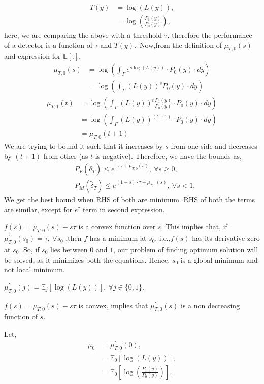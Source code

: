 \documentclass[a4paper,english,12pt]{article}
\begin{document}
\begin{align*}
T(y)&=\log(L(y)),\\
&=\log\left(\frac{P_1(y)}{P_0(y)}\right),
\end{align*}
here, we are comparing the above with a threshold $\tau$, therefore the performance of a detector is a function of $\tau$ and $T(y)$.\ Now,from the definition of $\mu_{T,0}(s)$ and expression for $\mathbb{E}[.]$,
\begin{align*}
 \mu_{T,0}(s)&=\log\left(\int_{\Gamma}{e^{s\log(L(y))}\cdot P_0(y)}\cdot dy\right)\\
&= \log\left(\int_{\Gamma}{(L(y))^s P_0(y)}\cdot dy\right)
\end{align*}
\begin{align*}
\mu_{T,1}(t)&=\log\left(\int_{\Gamma}{(L(y))^t \frac{P_1(y)}{P_0(y)}\cdot P_0(y)}\cdot dy\right)\\
&= \log\left(\int_{\Gamma}{(L(y))^{(t+1)}\cdot P_0(y)}\cdot dy\right)\\
&=\mu_{T,0}(t+1)
\end{align*}
We are trying to bound it such that it increases by $s$ from one side and decreases by $(t+1)$ from other (as $t$ is negative). Therefore, we have the bounds as,
\begin{align*}
&P_F(\tilde\delta_T)\leq e^{-s\tau+\mu_{T,0}(s)},~\forall s\geq 0,\\
&P_M(\tilde\delta_T)\leq e^{(1-s)\cdot\tau +\mu_{T,0}(s)},~\forall s<1.
\end{align*}
We get the best bound when RHS of both are minimum. RHS of both the terms are similar, except for $e^\tau$ term in second expression.
\begin{fact}
$f(s)=\mu_{T,0}(s)-s\tau$ is a convex function over $s$. This implies that, if $\mu^\prime_{T,0}(s_0)=\tau,~\forall s_0$ ,then $f$ has a minimum at $s_0$, i.e.,$f(s)$ has its derivative zero at $s_0$. So, if $s_0$ lies between $0$ and $1$, our problem of finding optimum solution will be solved, as it minimizes both the equations. Hence, $s_0$ is a global minimum and not local minimum.
\end{fact}
\begin{fact}
$\mu^\prime_{T,0} (j)=\mathbb{E}_j[\log(L(y))],~\forall j\in \{0,1\}$.
\end{fact}
\begin{fact}
$f(s)=\mu_{T,0}(s)-s\tau$ is convex, implies that $\mu^\prime_{T,0}(s)$ is a non decreasing function of $s$.
\end{fact}
Let,
\begin{align*}
\mu_0 &= \mu^\prime_{T,0}(0),\\&=\mathbb{E}_0[\log(L(y))],\\
&=\mathbb{E}_0\left[\log\left(\frac{P_1(y)}{P_0(y)}\right)\right].
\end{align*}
\end{document}
